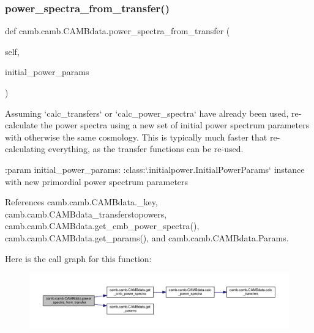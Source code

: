 \subsubsection{\texorpdfstring{power\+\_\+spectra\+\_\+from\+\_\+transfer()}{power\_spectra\_from\_transfer()}}
{\footnotesize\ttfamily def camb.\+camb.\+C\+A\+M\+Bdata.\+power\+\_\+spectra\+\_\+from\+\_\+transfer (\begin{DoxyParamCaption}\item[{}]{self,  }\item[{}]{initial\+\_\+power\+\_\+params }\end{DoxyParamCaption})}

\begin{DoxyVerb}Assuming `calc_transfers` or `calc_power_spectra` have already been used, re-calculate the power spectra
using a new set of initial power spectrum parameters with otherwise the same cosmology.
This is typically much faster that re-calculating everything, as the transfer functions can be re-used.

:param initial_power_params: :class:`.initialpower.InitialPowerParams` instance with new primordial power spectrum parameters
\end{DoxyVerb}
 

References camb.\+camb.\+C\+A\+M\+Bdata.\+\_\+key, camb.\+camb.\+C\+A\+M\+Bdata\+\_\+transferstopowers, camb.\+camb.\+C\+A\+M\+Bdata.\+get\+\_\+cmb\+\_\+power\+\_\+spectra(), camb.\+camb.\+C\+A\+M\+Bdata.\+get\+\_\+params(), and camb.\+camb.\+C\+A\+M\+Bdata.\+Params.

Here is the call graph for this function\+:
\nopagebreak
\begin{figure}[H]
\begin{center}
\leavevmode
\includegraphics[width=350pt]{classcamb_1_1camb_1_1CAMBdata_a9fceb84d376ce937446c78b7e8b9034a_cgraph}
\end{center}
\end{figure}
\mbox{\label{classcamb_1_1camb_1_1CAMBdata_a98a6c746b0bad46a24627c9fb384ecc6}} 
